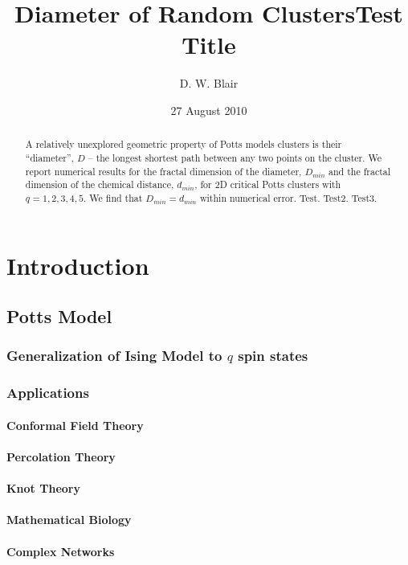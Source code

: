 \documentclass[pre,preprint]{revtex4-1}
\title{Diameter of Random Clusters}
\date{27 August 2010}
\begin{document}
\begin{abstract}
 A relatively unexplored geometric property of Potts models clusters is their ``diameter'', $D$ -- the longest shortest path between any two points on the cluster. We report numerical results for the fractal dimension of the diameter, $D_{min}$ and the fractal dimension of the chemical distance, $d_{min}$, for 2D critical Potts clusters with $q=1,2,3,4,5$. We find that $D_{min} = d_{min}$ within numerical error. Test. Test2. Test3.
\end{abstract}

\title {Test Title}
\author{D. W. Blair}
\maketitle
\section{Introduction}
\label{sec-1}
\subsection{Potts Model \cite{Wu82}}
\label{sec-1.1}
\subsubsection{Generalization of Ising Model to $q$ spin states}
\label{sec-1.1.1}
\subsubsection{Applications}
\label{sec-1.1.2}
\paragraph{Conformal Field Theory}
\label{sec-1.1.2.1}
\paragraph{Percolation Theory}
\label{sec-1.1.2.2}
\paragraph{Knot Theory}
\label{sec-1.1.2.3}
\paragraph{Mathematical Biology}
\label{sec-1.1.2.4}
\paragraph{Complex Networks}
\label{sec-1.1.2.5}
\end{document}
